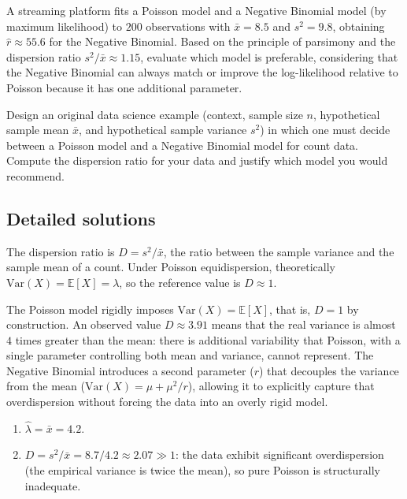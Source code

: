 \begin{problema}
	\label{prob:395bc31}
	A streaming platform fits a Poisson model and a Negative Binomial model (by maximum likelihood) to $200$ observations with $\bar{x}=8.5$ and $s^2=9.8$, obtaining $\hat{r}\approx55.6$ for the Negative Binomial. Based on the principle of parsimony and the dispersion ratio $s^2/\bar{x}\approx1.15$, evaluate which model is preferable, considering that the Negative Binomial can always match or improve the log-likelihood relative to Poisson because it has one additional parameter.
\end{problema}

\begin{problema}
	\label{prob:a28b8e6}
	Design an original data science example (context, sample size $n$, hypothetical sample mean $\bar{x}$, and hypothetical sample variance $s^2$) in which one must decide between a Poisson model and a Negative Binomial model for count data. Compute the dispersion ratio for your data and justify which model you would recommend.
\end{problema}

\subsection*{Detailed solutions}

\begin{solproblema}[prob:9b48fd0]
	The dispersion ratio is $D = s^2/\bar{x}$, the ratio between the sample variance and the sample mean of a count. Under Poisson equidispersion, theoretically $\text{Var}(X)=\mathbb{E}[X]=\lambda$, so the reference value is $D\approx1$.
\end{solproblema}

\begin{solproblema}[prob:65ac238]
	The Poisson model rigidly imposes $\text{Var}(X)=\mathbb{E}[X]$, that is, $D=1$ by construction. An observed value $D\approx3.91$ means that the real variance is almost $4$ times greater than the mean: there is additional variability that Poisson, with a single parameter controlling both mean and variance, cannot represent. The Negative Binomial introduces a second parameter ($r$) that decouples the variance from the mean ($\text{Var}(X)=\mu+\mu^2/r$), allowing it to explicitly capture that overdispersion without forcing the data into an overly rigid model.
\end{solproblema}

\begin{solproblema}[prob:486b84f]
	\begin{enumerate}
		\item $\hat{\lambda} = \bar{x} = 4.2$.
		\item $D = s^2/\bar{x} = 8.7/4.2 \approx 2.07 \gg 1$: the data exhibit significant overdispersion (the empirical variance is twice the mean), so pure Poisson is structurally inadequate.
	\end{enumerate}
\end{solproblema}

